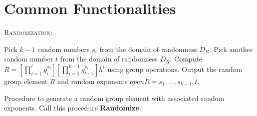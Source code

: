 \section{Common Functionalities}

\textsc{Randomization}:\\

\begin{algorithm}[H]\label{randomize}
\linesnumbered
{}
\dontprintsemicolon

\BlankLine

 \;
\Indp
  Pick $k-1$ random numbers $s_i$ from the domain of randomness $D_R$. \;
  Pick another random number $t$ from the domain of randomness $D_R$. \;
  Compute $R = [\prod_{i=1}^{l} g_i^{x_i}] [\prod_{i=1}^{k-1} g_{l+i}^{s_i}] h^{t}$ using group operations. \;
  Output the random group element $R$ and random exponents $openR = s_1,\ldots,s_{k-1},t$. \;
\Indm

\caption{Procedure to generate a random group element with associated random exponents. Call this procedure \textbf{Randomize}.}
\end{algorithm}
 
